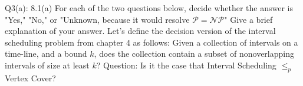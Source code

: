 \begin{problem}
  {Q3(a): 8.1(a)}
  For each of the two questions below, decide whether the answer is "Yes," "No," or "Unknown, because it would resolve $\mathcal{P} = \mathcal{NP}$"
  Give a brief explanation of your answer.
  Let's define the decision version of the interval scheduling problem from chapter 4 as follows: Given a collection of intervals on a time-line, and
  a bound $k$, does the collection contain a subset of nonoverlapping intervals of size at least $k$?
  Question: Is it the case that Interval Scheduling $\leq_{p}$ Vertex Cover?
\end{problem}
